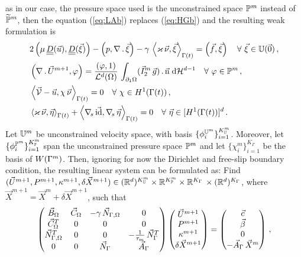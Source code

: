 as in our case, the pressure space used is the unconstrained space $\mathbb{P}^m$
instead of $\widetilde{\mathbb{P}}^m$, then the equation (\ref{eq:LAb}) replaces
(\ref{eq:HGb}) and the resulting weak formulation is
\begin{subequations}
\begin{align}
& 2\left(\mu\,\mat D(\vec u), \mat D(\vec \xi)\right)
- \left(p, \nabla\,.\,\vec \xi\right)
- \gamma\,\left\langle \varkappa\,\vec\nu, \vec\xi\right\rangle_{\Gamma(t)}
= \left(\vec f, \vec \xi\right)\quad \forall\ \vec\xi \in \uspace 0 \,,
\label{eq:HGcorrecteda}\\
& \left(\nabla\,.\,\vec U^{m+1}, \varphi\right) =
 \frac{\left(\varphi, 1\right)}{\vol(\Omega)}\, \int_{\partial_1\Omega}
(\vec I^m_2\,\vec g) \,.\, \unitn \dH{d-1} \quad \forall\ \varphi \in
\pspace^m\,, \label{eq:HGcorrectedb} \\
&  \left\langle \V - \vec u, \chi\,\vec\nu \right\rangle_{\Gamma(t)} = 0
\quad \forall\ \chi \in H^1(\Gamma(t))\,, \label{eq:HGcorrectedc} \\
& \left\langle \varkappa\,\vec\nu, \vec\eta \right\rangle_{\Gamma(t)}
+ \left\langle \nabs\,\vec \id, \nabs\,\vec \eta \right\rangle_{\Gamma(t)}
= 0  \quad \forall\ \vec\eta \in [H^1(\Gamma(t))]^d\,. \label{eq:HGcorrectedd}
\end{align}
\end{subequations}
Let $\mathbb{U}^m$ be unconstrained velocity space, with basis
$\{\phi_i^{\mathbb{U}^m}\}_{i=1}^{K^m_{\mathbb{U}}}$. Moreover, let
$\{\phi_i^{\mathbb{P}^m}\}_{i=1}^{K^m_{\mathbb{P}}}$ span the unconstrained pressure
space $\mathbb{P}^m$ and let
$\{\chi_i^m\}_{i=1}^{K_\Gamma}$ be the basis of $W(\Gamma^m)$. Then, ignoring for now
the Dirichlet and free-slip boundary condition, the resulting linear system can
be formulated as: Find ${(\vec U^{m+1},P^{m+1},
\kappa^{m+1},\delta\vec X^{m+1})\in (\mathbb R^d)^{K^m_{\mathbb{U}}}\times
\mathbb R^{K^m_{\mathbb{P}}} \times \mathbb R^{K_\Gamma}\,\times (\mathbb R^d)^{K_\Gamma}}$, where $\vec
X^{m+1} = \vec X^m+ \delta\vec X^{m+1}$, such that
\begin{equation}
\begin{pmatrix}
\vec B_\Omega & \vec C_\Omega & -\gamma\,\vec{N}_{\Gamma,\Omega} & 0 \\
\vec C^T_\Omega & 0 & 0 & 0 \\
\vec{N}_{\Gamma,\Omega}^T & 0 & 0 & -\frac1{\tau_m}\,\vec N_\Gamma^T \\
0 & 0 & \vec N_\Gamma & \vec A_\Gamma
\end{pmatrix}
\begin{pmatrix}
\vec U^{m+1} \\
P^{m+1} \\
\kappa^{m+1} \\
\delta\vec X^{m+1}
\end{pmatrix}
=
\begin{pmatrix}
\vec c \\
\vec \beta \\
0 \\
-\vec A_\Gamma\,\vec X^m
\end{pmatrix} \,,
\label{eq:stokes_algebraic}
\end{equation}
